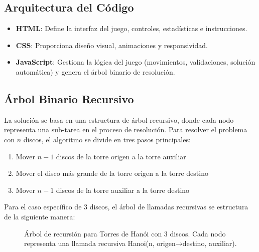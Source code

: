 \documentclass{article}
\begin{document}
\subsection{Arquitectura del Código}
\begin{itemize}
    \item \textbf{HTML}: Define la interfaz del juego, controles, estadísticas e instrucciones.
    \item \textbf{CSS}: Proporciona diseño visual, animaciones y responsividad.
    \item \textbf{JavaScript}: Gestiona la lógica del juego (movimientos, validaciones, solución automática) y genera el árbol binario de resolución.
\end{itemize}

\subsection{Árbol Binario Recursivo}
La solución se basa en una estructura de árbol recursivo, donde cada nodo representa una sub-tarea en el proceso de resolución. Para resolver el problema con $n$ discos, el algoritmo se divide en tres pasos principales:
\begin{enumerate}
    \item Mover $n-1$ discos de la torre origen a la torre auxiliar
    \item Mover el disco más grande de la torre origen a la torre destino
    \item Mover $n-1$ discos de la torre auxiliar a la torre destino
\end{enumerate}

Para el caso específico de 3 discos, el árbol de llamadas recursivas se estructura de la siguiente manera:

\begin{figure}[h]
\centering
{}
\caption{Árbol de recursión para Torres de Hanói con 3 discos. Cada nodo representa una llamada recursiva Hanoi(n, origen→destino, auxiliar).}
\end{figure}
\end{document}
